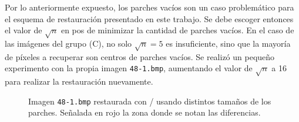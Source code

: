  Por lo anteriormente expuesto, los parches vac\'ios son un caso problem\'atico para el esquema de restauraci\'on presentado en este trabajo. Se debe escoger entonces el valor de $\sqrt{n}$ en pos de minimizar la cantidad de parches vac\'ios. En el caso de las im\'agenes del grupo (C), no solo $\sqrt{n} = 5$ es insuficiente, sino que la mayor\'ia de p\'ixeles a recuperar son centros de parches vac\'ios. Se realiz\'o un pequeño experimento con la propia imagen \texttt{48-1.bmp}, aumentando el valor de $\sqrt{n}$ a 16 para realizar la restauraci\'on nuevamente.
 \begin{figure}[H]
 	\centering
 	\caption{Imagen \texttt{48-1.bmp} restaurada con \SOP/ usando distintos tamaños de los parches. Señalada en rojo la zona donde se notan las diferencias.}
 	\label{fig:patches_diffs}
 \end{figure}
